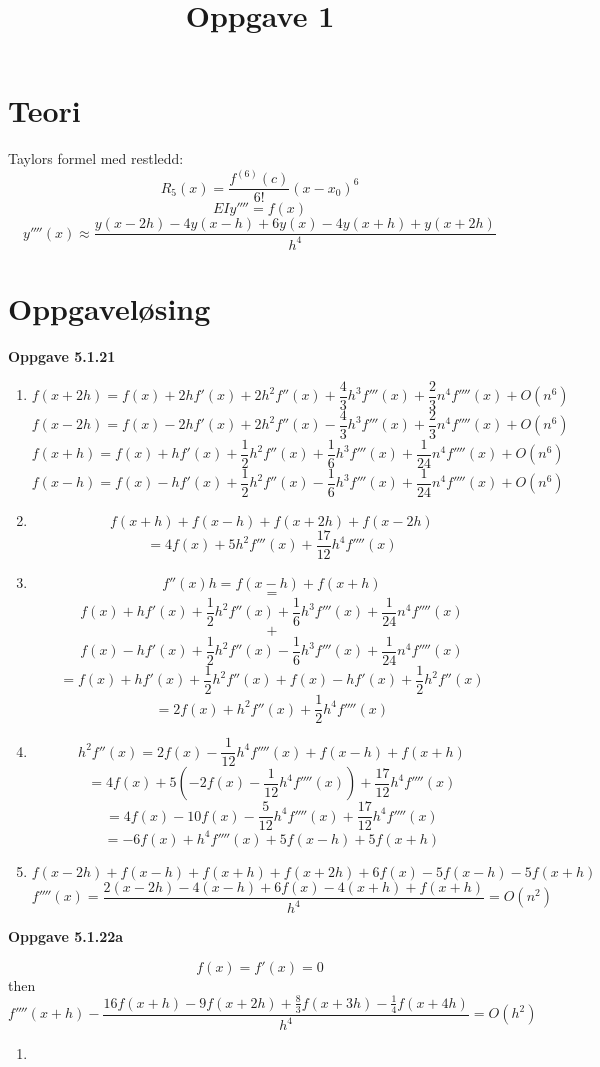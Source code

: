 \documentclass[11pt]{article}
\title{Oppgave 1}
\begin{document}
        \section{Teori}
        Taylors formel med restledd:
        \[R_5(x)= \frac{f^{(6)}(c)} {6!}(x-x_0)^6\]
        \[EIy''''=f(x)\]
        \[y''''(x) \approx \frac{y(x - 2h)-4y(x - h)+ 6y(x) - 4y(x + h) + y(x + 2h)}{h^4}\]
        \section{Oppgaveløsing}
    
    \textbf{Oppgave 5.1.21}
    \begin{enumerate}

        \item \[f(x + 2h) = f(x) + 2hf'(x) + 2h^2f''(x) + \frac{4}{3}h^3f'''(x)+ \frac{2}{3}n^4f''''(x) +O(n^6)\]
         \[f(x - 2h) = f(x) - 2hf'(x) + 2h^2f''(x) - \frac{4}{3}h^3f'''(x)+ \frac{2}{3}n^4f''''(x) +O(n^6)\]
         \[f(x + h) = f(x) + hf'(x) + \frac{1}{2}h^2f''(x) + \frac{1}{6}h^3f'''(x)+ \frac{1}{24}n^4f''''(x) +O(n^6)\]
         \[f(x - h) = f(x) - hf'(x) + \frac{1}{2}h^2f''(x) - \frac{1}{6}h^3f'''(x)+ \frac{1}{24}n^4f''''(x) +O(n^6)\]
        \item \[f(x + h) + f(x - h) + f(x + 2h) + f(x - 2h)\]
        \[= 4f(x) + 5h^2f'''(x) + \frac{17}{12}h^4f''''(x)\]
        \item \[f''(x)h = f(x - h) + f(x + h)\]
        \[=\]
        \[f(x) + hf'(x) + \frac{1}{2}h^2f''(x) + \frac{1}{6}h^3f'''(x)+ \frac{1}{24}n^4f''''(x)\]
        \[+\]
        \[f(x) - hf'(x) + \frac{1}{2}h^2f''(x) - \frac{1}{6}h^3f'''(x)+ \frac{1}{24}n^4f''''(x)\]
        \[= f(x) + hf'(x) + \frac{1}{2}h^2f''(x) + f(x) - hf'(x) + \frac{1}{2}h^2f''(x)\]
        \[= 2f(x) + h^2f''(x) + \frac{1}{2}h^4f''''(x)\]
        \item
        \[h^2f''(x) = 2f(x) - \frac{1}{12}h^4f''''(x) + f(x - h) + f(x + h)\]
        \[= 4f(x) + 5(-2f(x)-\frac{1}{12} h^4f''''(x)) + \frac{17}{12}h^4f''''(x)\]
        \[= 4f(x) - 10f(x) - \frac{5}{12}h^4f''''(x) + \frac{17}{12}h^4f''''(x)\]
        \[= -6f(x) + h^4f''''(x) + 5f(x - h) + 5f(x + h)\]
        \item \[f(x - 2h) + f(x - h) + f(x + h) + f(x + 2h) + 6f(x) - 5f(x - h) - 5f(x + h)\]
        \[f''''(x) = \frac{2(x-2h) - 4(x-h) + 6f(x) - 4(x+h) + f(x+h)} {h^4} = O(n^2)\]
        
    \end{enumerate}

    \textbf{Oppgave 5.1.22a}

    \[f(x) = f'(x) = 0\]
    then
    \[f''''(x+h) - \frac{16f(x+h) - 9f(x+2h) + \frac{8}{3}f(x+3h)-\frac{1}{4}f(x+4h)}{h^4}=O(h^2)\]

    \begin{enumerate}
        \item 
    \end{enumerate}

        

        
\end{document}
